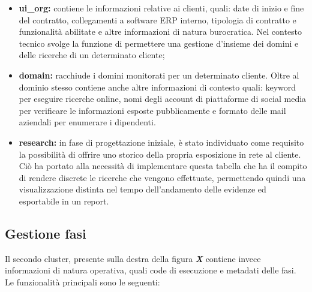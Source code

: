 \begin{itemize}
  \item \textbf{ui\_org:} contiene le informazioni relative ai clienti, quali:
    date di inizio e fine del contratto, collegamenti a software ERP interno,
    tipologia di contratto e funzionalità abilitate e altre informazioni di
    natura burocratica. Nel contesto tecnico svolge la funzione di permettere una
    gestione d'insieme dei domini e delle ricerche di un determinato cliente;

  \item \textbf{domain:} racchiude i domini monitorati per un determinato
    cliente. Oltre al dominio stesso contiene anche altre informazioni di contesto
    quali: keyword per eseguire ricerche online, nomi degli account di piattaforme
    di social media per verificare le informazioni esposte pubblicamente e formato
    delle mail aziendali per enumerare i dipendenti.

  \item \textbf{research:} in fase di progettazione iniziale, è stato individuato
    come requisito la possibilità di offrire uno storico della propria esposizione
    in rete al cliente. Ciò ha portato alla necessità di implementare questa
    tabella che ha il compito di rendere discrete le ricerche che vengono
    effettuate, permettendo quindi una visualizzazione distinta nel tempo dell'andamento
    delle evidenze ed esportabile in un report.
\end{itemize}

\subsection{Gestione fasi}
\label{sub:db:tasks}

Il secondo cluster, presente sulla destra della figura \textbf{\textit{X}}
contiene invece informazioni di natura operativa, quali code di esecuzione e metadati
delle fasi. Le funzionalità principali sono le seguenti:

